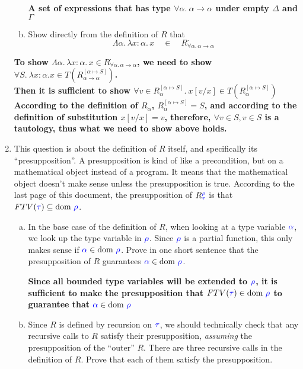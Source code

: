 \documentclass{article}
\theoremstyle{definition}
\newcommand{\meta}[1]{{\color{blue}#1}}
\newcommand{\dom}[1]{\ensuremath{\text{dom}\ #1}}
\begin{document}
\begin{enumerate}[start=1,label={{\bf Problem \arabic*}.},ref=\arabic*,left=0pt..0pt,widest*=10,align=left,itemindent=*]
\begin{enumerate}[(a),left=1em]
  \textbf{A set of expressions that has type $\forall \alpha.\ \alpha \to \alpha$ under empty $\Delta$ and $\Gamma$}

  \item
  Show directly from the definition of $R$ that
  \[
    \Lambda\alpha.\,\lambda x:\alpha.\, x \quad\in\quad R_{\forall\alpha.\, \alpha\to\alpha}^{\cdot}
  \]
  \end{enumerate}

  \textbf{To show $\Lambda\alpha.\,\lambda x:\alpha.\, x \in R_{\forall\alpha.\, \alpha\to\alpha}^{\cdot}$, we need to show $\forall S.\ \lambda x : \alpha. x \in T(R^{[\alpha \mapsto S]}_{\alpha \to \alpha})$. \\Then it is sufficient to show $\forall v \in R_{\alpha}^{[\alpha \mapsto S]}.\ x[v/x]\in T(R_{\alpha}^{[\alpha\mapsto S]})$ According to the definition of $R_\alpha$, $R_{\alpha}^{[\alpha\mapsto S]} = S$, and according to the definition of substitution $x[v/x]=v$, therefore, $\forall v\in S, v\in S$ is a tautology, thus what we need to show above holds.}

\item This question is about the definition of $R$ itself, and specifically its
  ``presupposition''.  A presupposition is kind of like a precondition, but on a
  mathematical object instead of a program.  It means that the mathematical
  object doesn't make sense unless the presupposition is true. According to the
  last page of this document, the presupposition of
  $R_{\meta{\tau}}^{\meta{\rho}}$ is that
  $FTV(\meta{\tau})\subseteq\dom{\meta{\rho}}$.
  \begin{enumerate}[(a),left=1em]
  \item In the base case of the definition of $R$, when looking at a type
    variable $\meta{\alpha}$, we look up the type variable in
    $\meta{\rho}$. Since $\meta{\rho}$ is a partial function, this only makes
    sense if $\meta{\alpha}\in\dom{\meta{\rho}}$.  Prove in one short sentence
    that the presupposition of $R$ guarantees
    $\meta{\alpha}\in\dom{\meta{\rho}}$.

    \textbf{Since all bounded type variables will be extended to $\meta{\rho}$, it is sufficient to make the presupposition that $FTV(\meta{\tau})\in \dom \meta{\rho}$ to guarantee that $\meta{\alpha}\in \dom \meta{\rho}$}

  \item Since $R$ is defined by recursion on $\meta{\tau}$, we should technically check
    that any recursive calls to $R$ satisfy their presupposition,
    \emph{assuming} the presupposition of the ``outer'' $R$. There are three
    recursive calls in the definition of $R$. Prove that each of them satisfy
    the presupposition.


\end{enumerate}
\end{enumerate}
\end{document}

